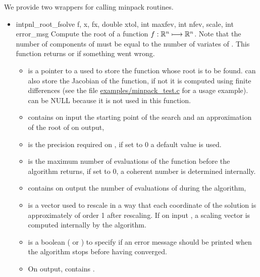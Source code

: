 We provide two wrappers for calling minpack routines.
\begin{itemize}
\item \describefun
  {int}{pnl_root_fsolve}{ \ptr f,
     \ptr x,  \ptr fx, double xtol,
    int maxfev, int \ptr nfev,  \ptr scale, int
    error_msg}
  \sshortdescribe Compute the root of a function $f:{\mathbb R}^n \longmapsto
  {\mathbb R}^n$. Note that the number of components of  must be equal to the
  number of variates of . This function returns  or
   if something went wrong.
  \parameters
  \begin{itemize}
  \item {} is a pointer to a  used to
    store the function whose root is to be found.  can also
    store the Jacobian of the function, if not it is computed using
    finite differences (see the file \url{examples/minpack_test.c} for
    a usage example).  can be NULL because it is
    not used in this function.
  \item  {} contains on input the starting point of the search and
    an approximation of the root of  on output,
  \item {} is the precision required on , if set to 0 a
    default value is used.
  \item {} is the maximum number of evaluations of the function
     before the algorithm returns, if set to 0, a coherent
    number is determined internally.
  \item {} contains on output the number of evaluations of
     during the algorithm,
  \item {} is a vector used to rescale  in a way that
    each coordinate of the solution is approximately of order 1 after
    rescaling. If on input , a scaling vector is
    computed internally by the algorithm.
  \item {} is a boolean
    ( or ) to specify if an error message should be
    printed when the algorithm stops before having converged.
  \item On output,  contains .
  \end{itemize}


\end{itemize}
